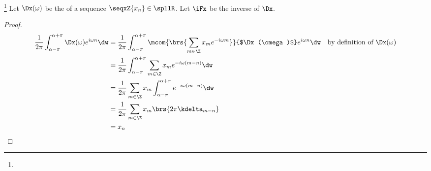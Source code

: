 \begin{theorem}
\footnote{
  }
\label{thm:idtft}
Let $\Dx(\omega)$ be the   of a sequence $\seqxZ{x_n}\in\spllR$.
Let $\iFx$ be the inverse of $\Dx$.
\end{theorem}
\begin{proof}
\begin{align*}
  \frac{1}{2\pi}\int_{\alpha-\pi}^{\alpha+\pi} \Dx(\omega) e^{i\omega n} \dw
    &= \frac{1}{2\pi}\int_{\alpha-\pi}^{\alpha+\pi} \mcom{\brs{\sum_{m\in\Z} x_m e^{-i\omega m}}}{$\Dx(\omega)$} e^{i\omega n} \dw
    && \text{by definition of $\Dx(\omega)$}
  \\&= \frac{1}{2\pi}\int_{\alpha-\pi}^{\alpha+\pi} \sum_{m\in\Z} x_m e^{-i\omega(m-n)}\dw
  \\&= \frac{1}{2\pi}\sum_{m\in\Z} x_m \int_{\alpha-\pi}^{\alpha+\pi} e^{-i\omega(m-n)}\dw
  \\&= \frac{1}{2\pi}\sum_{m\in\Z} x_m \brs{2\pi\kdelta_{m-n}}
  \\&= x_n 
\end{align*}
\end{proof}

